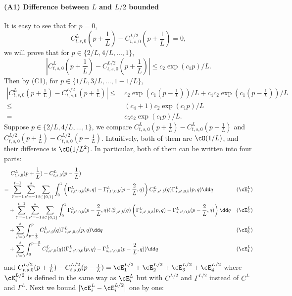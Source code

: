 \paragraph{(A1) Difference between $L$ and $L/2$ bounded} It is easy to see that for $p=0$, \[C^L_{t,s,0}(p+\frac1L) - C^{L/2}_{t,s,0}(p+\frac1L)=0,\]
we will prove that for $p\in \{2/L, 4/L, \ldots, 1\}$, 
\[|C^L_{t,s,0}(p+\frac1L) - C^{L/2}_{t,s,0}(p+\frac1L)|\leq c_2\exp(c_1p)/L.\]
Then by (C1), for $p\in \{1/L, 3/L, \ldots, 1-1/L\}$,
\begin{align*}
|C^L_{t,s,0}(p+\frac1L) - C^{L/2}_{t,s,0}(p+\frac1L)|\leq &~c_2\exp(c_1(p-\frac1L))/L+c_4c_2\exp(c_1(p-\frac1L))/L\\
\leq &~(c_4+1)c_2\exp(c_1p)/L \\
=&~ c_5c_2\exp(c_1p)/L.
\end{align*}
Suppose $p\in \{2/L, 4/L, \ldots, 1\}$,
we compare $C^L_{t,s,0}(p+\frac1L) - C^L_{t,s,0}(p-\frac1L)$ and $C^{L/2}_{t,s,0}(p+\frac1L) - C^{L/2}_{t,s,0}(p-\frac1L)$. Intuitively, both of them are $\cO(1/L)$, and their difference is $\cO(1/L^2)$.
In particular, both of them can be written into four parts:
\begin{align*}
    &~C^L_{t,s,0}(p+\frac1L) - C^L_{t,s,0}(p-\frac1L) \\
    =&~\sum_{t'=-1}^{t-1}\sum_{s'=-1}^s \sum_{b\in \{0, 1\}} \int_0^1 \left(\Gamma^L_{t,t',0,b}(p,q) - \Gamma^L_{t,t',0,b}(p-\frac2L,q)\right) C^L_{t',s',b}(q)\Gamma^L_{s,s',0,b}(p,q) \dd q & (\cE_1^L) \\
    & + \sum_{t'=-1}^{t-1}\sum_{s'=-1}^s \sum_{b\in \{0, 1\}} \int_0^1 \Gamma^L_{t,t',0,b}(p-\frac2L,q) C^L_{t',s',b}(q)\left(\Gamma^L_{s,s',0,b}(p,q) -\Gamma^L_{s,s',0,b}(p-\frac2L,q)\right) \dd q & (\cE_2^L) \\
    & + \sum_{s'=0}^s \int_{p-\frac2L}^p C^L_{t,s',0}(q) \Gamma_{s,s',0,0}^L(p,q)\dd q & (\cE_3^L)\\
    & + \sum_{s'=0}^s \int_0^{p-\frac2L} C^L_{t,s',0}(q) (\Gamma_{s,s',0,0}^L(p,q)-\Gamma_{s,s',0,0}^L(p-\frac2L,q))\dd q & (\cE_4^L)
\end{align*}
and $C^{L/2}_{t,s,0}(p+\frac1L) - C^{L/2}_{t,s,0}(p-\frac1L) = \cE_1^{L/2} + \cE_2^{L/2}+\cE_3^{L/2}+\cE_4^{L/2}$ where 
$\cE_i^{L/2}$ is defined in the same way as $\cE_i^L$ but with $C^{L/2}$ and $\Gamma^{L/2}$ instead of $C^L$ and $\Gamma^L$. Next we bound $|\cE_i^L-\cE_i^{L/2}|$ one by one:

